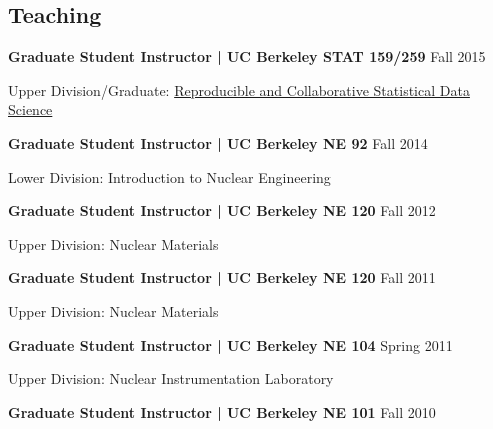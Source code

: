 \documentclass[margin,line]{res}
\newenvironment{list1}{
  \begin{list}{\ding{113}}{%
      \setlength{\itemsep}{0in}
      \setlength{\parsep}{0in} \setlength{\parskip}{0in}
      \setlength{\topsep}{0in} \setlength{\partopsep}{0in} 
      \setlength{\leftmargin}{0.17in}}}{\end{list}}
\begin{document}
\begin{resume}
\section{\sc Teaching\footnotemark}

{\bf Graduate Student Instructor | UC Berkeley STAT 159/259} \hfill Fall 2015 

\begin{list1}
\item[] Upper Division\footnotemark/Graduate: 
        \href{http://www.jarrodmillman.com/stat159-fall2015/}
             {Reproducible and Collaborative Statistical Data Science}
\end{list1}
{\bf Graduate Student Instructor | UC Berkeley NE 92} \hfill Fall 2014

\begin{list1}
  \item[] Lower Division: Introduction to Nuclear Engineering
\end{list1}
{\bf Graduate Student Instructor | UC Berkeley NE 120} \hfill Fall 2012

\begin{list1}
  \item[] Upper Division: Nuclear Materials
\end{list1}
{\bf Graduate Student Instructor | UC Berkeley NE 120} \hfill Fall 2011

\begin{list1}
  \item[] Upper Division: Nuclear Materials
\end{list1}
{\bf Graduate Student Instructor | UC Berkeley NE 104} \hfill Spring 2011

\begin{list1}
  \item[] Upper Division: Nuclear Instrumentation Laboratory
\end{list1}
{\bf Graduate Student Instructor | UC Berkeley NE 101} \hfill Fall 2010


\end{resume}
\end{document}
